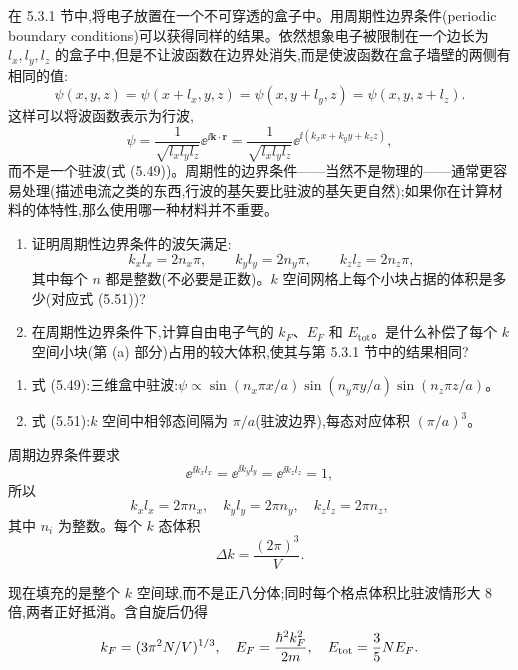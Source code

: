 \begin{question}
在 5.3.1 节中,将电子放置在一个不可穿透的盒子中。用周期性边界条件(periodic boundary conditions)可以获得同样的结果。依然想象电子被限制在一个边长为 $l_x,l_y,l_z$ 的盒子中,但是不让波函数在边界处消失,而是使波函数在盒子墙壁的两侧有相同的值:
\[
\psi(x,y,z)=\psi(x+l_x,y,z)=\psi(x,y+l_y,z)=\psi(x,y,z+l_z).
\]
这样可以将波函数表示为行波,
\[
\psi=\frac{1}{\sqrt{l_xl_yl_z}}\ee^{\ii\mathbf k\cdot\mathbf r}=\frac{1}{\sqrt{l_xl_yl_z}}\ee^{\ii(k_xx+k_yy+k_zz)},
\]
而不是一个驻波(式 (5.49))。周期性的边界条件——当然不是物理的——通常更容易处理(描述电流之类的东西,行波的基矢要比驻波的基矢更自然);如果你在计算材料的体特性,那么使用哪一种材料并不重要。
\begin{enumerate}
\item 证明周期性边界条件的波矢满足:
\[
k_xl_x=2n_x\pi,\qquad k_yl_y=2n_y\pi,\qquad k_zl_z=2n_z\pi,
\]
其中每个 $n$ 都是整数(不必要是正数)。$k$ 空间网格上每个小块占据的体积是多少(对应式 (5.51))?
\item 在周期性边界条件下,计算自由电子气的 $k_F$、$E_F$ 和 $E_{\mathrm{tot}}$。是什么补偿了每个 $k$ 空间小块(第 (a) 部分)占用的较大体积,使其与第 5.3.1 节中的结果相同?
\end{enumerate}

\par\smallskip
{}
\begin{enumerate}[leftmargin=2.2em,itemsep=0.12em,topsep=0.12em,parsep=0pt]
\item 式 (5.49):三维盒中驻波:$\psi\propto\sin(n_x\pi x/a)\sin(n_y\pi y/a)\sin(n_z\pi z/a)$。
\item 式 (5.51):$k$ 空间中相邻态间隔为 $\pi/a$(驻波边界),每态对应体积 $(\pi/a)^3$。
\end{enumerate}

\begin{solution}

周期边界条件要求
\[
\ee^{\ii k_xl_x}=\ee^{\ii k_yl_y}=\ee^{\ii k_zl_z}=1,
\]
所以
\[
k_xl_x=2\pi n_x,
\quad k_yl_y=2\pi n_y,
\quad k_zl_z=2\pi n_z,
\]
其中 $n_i$ 为整数。每个 $k$ 态体积
\[
\Delta k=\frac{(2\pi)^3}{V}.
\]

现在填充的是整个 $k$ 空间球,而不是正八分体;同时每个格点体积比驻波情形大 $8$ 倍,两者正好抵消。含自旋后仍得
\[
k_F=(3\pi^2N/V)^{1/3},
\quad E_F=\frac{\hbar^2k_F^2}{2m},
\quad E_{\rm tot}=\frac35NE_F.
\]

\end{solution}
\end{question}
